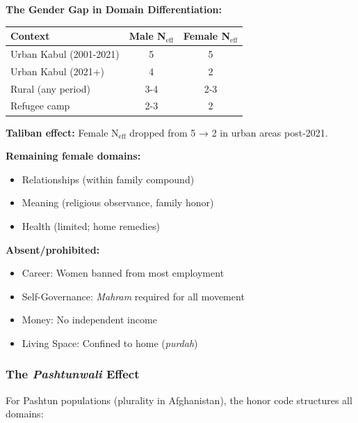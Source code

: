 \begin{tcolorbox}[colback=red!5!white, colframe=red!75!black, title=Finding: Gender Creates Maximum Domain Disparity]

\textbf{The Gender Gap in Domain Differentiation:}

\begin{center}
\begin{tabular}{@{}lcc@{}}
\toprule
\textbf{Context} & \textbf{Male N$_{\text{eff}}$} & \textbf{Female N$_{\text{eff}}$} \\
\midrule
Urban Kabul (2001-2021) & 5 & 5 \\
Urban Kabul (2021+) & 4 & 2 \\
Rural (any period) & 3-4 & 2-3 \\
Refugee camp & 2-3 & 2 \\
\bottomrule
\end{tabular}
\end{center}

\textbf{Taliban effect:} Female N$_{\text{eff}}$ dropped from 5 → 2 in urban areas post-2021.

\textbf{Remaining female domains:}
\begin{itemize}[nosep]
\item Relationships (within family compound)
\item Meaning (religious observance, family honor)
\item Health (limited; home remedies)
\end{itemize}

\textbf{Absent/prohibited:}
\begin{itemize}[nosep]
\item Career: Women banned from most employment
\item Self-Governance: \textit{Mahram} required for all movement
\item Money: No independent income
\item Living Space: Confined to home (\textit{purdah})
\end{itemize}

\end{tcolorbox}

\subsubsection{The \textit{Pashtunwali} Effect}

For Pashtun populations (plurality in Afghanistan), the honor code structures all domains:

